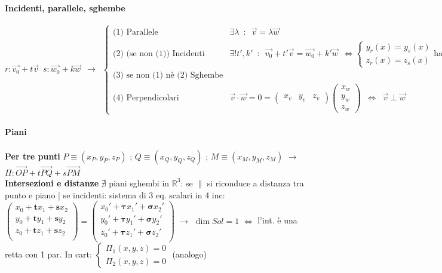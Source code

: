 \documentclass[10pt]{article}
\theoremstyle{plain}
\begin{document}
\paragraph{Incidenti, parallele, sghembe}
\[r : \Vec{v_0} + t \Vec{v} \enspace
s : \Vec{w_0} + k \Vec{w} \enspace \rightarrow \enspace \begin{cases}
    \textrm{(1) Parallele} & \exists \lambda \enspace : \enspace \Vec{v} = \lambda \Vec{w}\\
    \textrm{(2) (se non (1)) Incidenti} & \exists! t', k' \enspace : \enspace \Vec{v_0} + t' \Vec{v} = \Vec{w_0} + k' \Vec{w} \enspace \Longleftrightarrow \begin{cases}
        y_r(x) = y_s(x)\\
        z_r(x) = z_s(x)
    \end{cases} \textrm{ha sol}\\
    \textrm{(3) se non (1) nè (2) Sghembe}\\
    \textrm{(4) Perpendicolari} & \Vec{v} \cdot \Vec{w} = 0 = \begin{pmatrix}
        x_v & y_v & z_v
    \end{pmatrix} \begin{pmatrix}
     x_w\\y_w\\z_w
    \end{pmatrix} \enspace \Longleftrightarrow \enspace \Vec{v} \perp \Vec{w}
\end{cases}\]
\paragraph{Piani}
\textbf{Per tre punti} $P \equiv (x_P, y_P, z_P)$ ; $Q \equiv (x_Q, y_Q, z_Q)$ ; $M \equiv (x_M, y_M, z_M)$ $\rightarrow$ $\Pi : \Vec{OP} + t \Vec{PQ} + s \Vec{PM}$\\
\textbf{Intersezioni e distanze} $\nexists$ piani sghembi in $\mathbb{R}^3$: se $\|$ si riconduce a distanza tra punto e piano | se incidenti: sistema di 3 eq. scalari in 4 inc: $\begin{pmatrix}
    x_0 + \mathbf{t} x_1 + \mathbf{s} x_2\\
    y_0 + \mathbf{t} y_1 + \mathbf{s} y_2\\
    z_0 + \mathbf{t} z_1 + \mathbf{s} z_2\\
\end{pmatrix} = \begin{pmatrix}
    x_0' + \mathbf{\tau} x_1' + \mathbf{\sigma} x_2'\\
    y_0' + \mathbf{\tau} y_1' + \mathbf{\sigma} y_2'\\
    z_0' + \mathbf{\tau} z_1' + \mathbf{\sigma} z_2'\\
\end{pmatrix}$ $\rightarrow$ $\dim Sol = 1$ $\Leftrightarrow$ l'int. è una retta con 1 par. In cart: $\begin{cases}
    \Pi_1 (x, y, z) = 0\\
    \Pi_2 (x, y, z) = 0
\end{cases}$ (analogo)
\end{document}
